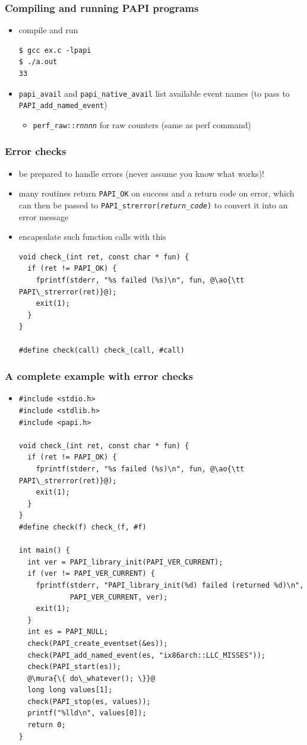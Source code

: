 \documentclass[12pt,dvipdfmx]{beamer}
\newcommand{\mura}[1]{{\color{purple}#1}}
\newcommand{\ao}[1]{{\color{blue}#1}}
\begin{document}
\begin{frame}[fragile]
\frametitle{Compiling and running PAPI programs}
\begin{itemize}
\item compile and run
\begin{lstlisting}
$ gcc ex.c -lpapi
$ ./a.out
33
\end{lstlisting} %
\item {\tt papi\_avail} and {\tt papi\_native\_avail} list
available event names (to pass to {\tt PAPI\_add\_named\_event})
\begin{itemize}
\item {\tt perf\_raw::r{\it nnnn}} for raw counters (same as perf command)
\end{itemize}
\end{itemize}
\end{frame}

\begin{frame}[fragile]
\frametitle{Error checks}
\begin{itemize}
\item be prepared to handle errors 
  (never assume you know what works)!
\item many routines return {\tt PAPI\_OK} on success
  and a return code on error, which can then be passed
  to \ao{\tt PAPI\_strerror({\it return\_code})} to 
  convert it into an error message
\item encapsulate such function calls with this
\begin{lstlisting}
void check_(int ret, const char * fun) {
  if (ret != PAPI_OK) {
    fprintf(stderr, "%s failed (%s)\n", fun, @\ao{\tt PAPI\_strerror(ret)}@);
    exit(1);
  }
}

#define check(call) check_(call, #call)
\end{lstlisting}
\end{itemize}
\end{frame}


\begin{frame}[fragile]
\frametitle{A complete example with error checks}
\begin{itemize}
\item []
\begin{lstlisting}[basicstyle = \ttfamily\tiny]
#include <stdio.h>
#include <stdlib.h>
#include <papi.h>

void check_(int ret, const char * fun) {
  if (ret != PAPI_OK) {
    fprintf(stderr, "%s failed (%s)\n", fun, @\ao{\tt PAPI\_strerror(ret)}@);
    exit(1);
  }
}
#define check(f) check_(f, #f)

int main() {
  int ver = PAPI_library_init(PAPI_VER_CURRENT);
  if (ver != PAPI_VER_CURRENT) {
    fprintf(stderr, "PAPI_library_init(%d) failed (returned %d)\n",
            PAPI_VER_CURRENT, ver);
    exit(1);
  }
  int es = PAPI_NULL;
  check(PAPI_create_eventset(&es));
  check(PAPI_add_named_event(es, "ix86arch::LLC_MISSES"));
  check(PAPI_start(es));
  @\mura{\{ do\_whatever(); \}}@
  long long values[1];
  check(PAPI_stop(es, values));
  printf("%lld\n", values[0]);
  return 0;
}
\end{lstlisting}
\end{itemize}
\end{frame}
\end{document}
